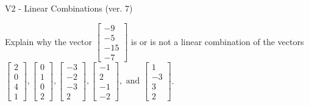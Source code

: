 \begin{exercise}
  \begin{exerciseTitle}V2 - Linear Combinations (ver. 7)\end{exerciseTitle}
  \begin{exerciseStatement}
    Explain why the vector \(\left[\begin{array}{c}
-9 \\
-5 \\
-15 \\
-7
\end{array}\right]\)  is or is not a linear 
	combination of the vectors \(\left[\begin{array}{c}
2 \\
0 \\
4 \\
1
\end{array}\right] , \left[\begin{array}{c}
0 \\
1 \\
0 \\
2
\end{array}\right] , \left[\begin{array}{c}
-3 \\
-2 \\
-3 \\
2
\end{array}\right] , \left[\begin{array}{c}
-1 \\
2 \\
-1 \\
-2
\end{array}\right] , \text{ and } \left[\begin{array}{c}
1 \\
-3 \\
3 \\
2
\end{array}\right]\).
	



\end{exerciseStatement}
\end{exercise}
